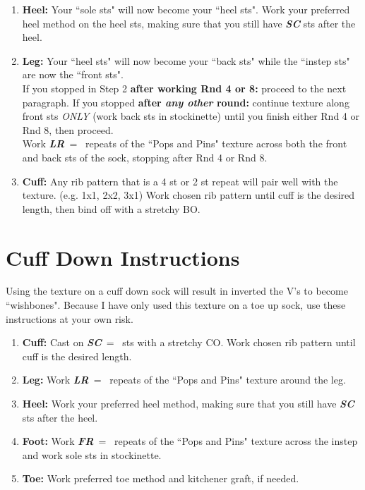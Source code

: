 \documentclass[12pt]{article}
\newcommand{\vocab}[1]{\emph{\textbf{#1}}} %
\newcommand{\rowDir}[1]{\textbf{#1:}} %
\newcommand{\blank}{\underline{\hspace{2em}} }
\begin{document}
\begin{titlingpage}
\begin{multicols}{2}
\begin{enumerate}
\item \rowDir{Heel} Your ``sole sts" will now become your ``heel sts". Work your preferred heel method on the heel sts, making sure that you still have \vocab{SC} sts after the heel.

\item \rowDir{Leg} Your ``heel sts" will now become your ``back sts" while the ``instep sts" are now the ``front sts". 
\vspace{1em} \\  If you stopped in Step 2 \textbf{after working Rnd 4 or 8:} proceed to the next paragraph. If you stopped \textbf{after \emph{any other} round:} continue texture along front sts \emph{ONLY} (work back sts in stockinette) until you finish either Rnd 4 or Rnd 8, then proceed. 
\vspace{1em} \\ Work \vocab{LR}~=~\blank repeats of the ``Pops and Pins" texture across both the front and back sts of the sock, stopping after Rnd 4 or Rnd 8.

\item \rowDir{Cuff} Any rib pattern that is a 4 st or 2 st repeat will pair well with the texture. (e.g. 1x1, 2x2, 3x1) Work chosen rib pattern until cuff is the desired length, then bind off with a stretchy BO.
\end{enumerate}

\section*{Cuff Down Instructions}

Using the texture on a cuff down sock will result in inverted the V's to become ``wishbones". Because I have only used this texture on a toe up sock, use these instructions at your own risk.

\begin{enumerate}
\item \rowDir{Cuff} Cast on \vocab{SC}~=~\blank sts with a stretchy CO. Work chosen rib pattern until cuff is the desired length.
\item \rowDir{Leg} Work \vocab{LR}~=~\blank repeats of the ``Pops and Pins" texture around the leg.
\item \rowDir{Heel} Work your preferred heel method, making sure that you still have \vocab{SC} sts after the heel.
\item \rowDir{Foot} Work \vocab{FR}~=~\blank repeats of the ``Pops and Pins" texture across the instep and work sole sts in stockinette. 
\item \rowDir{Toe} Work preferred toe method and kitchener graft, if needed.
\end{enumerate}

\vfill

\newpage
\end{multicols}

\end{titlingpage}
\end{document}
